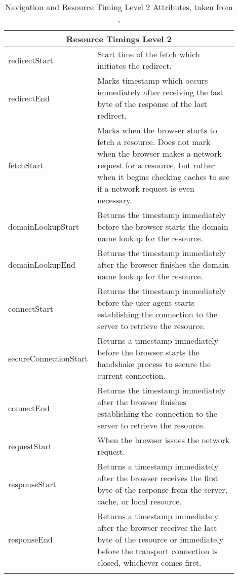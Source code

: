 \begin{center}
\begin{longtable}{ | p{0.3\linewidth} | p{0.6\linewidth} | }
	\hline
	\multicolumn{2}{|c|}{ \cellcolor{lightgrey} Resource Timings Level 2} \\
	\hline
	redirectStart & Start time of the fetch which initiates the redirect. \\
	\hline
	redirectEnd & Marks timestamp which occurs immediately after receiving the last byte of the response of the last redirect. \\
	\hline
	fetchStart & Marks when the browser starts to fetch a resource. Does not mark when the browser makes a network request for a resource, but rather when it begins checking caches to see if a network request is even necessary.  \\ %
	\hline
	domainLookupStart & Returns the timestamp immediately before the browser starts the domain name lookup for the resource. \\
	\hline
	domainLookupEnd & Returns the timestamp immediately after the browser finishes the domain name lookup for the resource. \\
	\hline
	connectStart & Returns the timestamp immediately before the user agent starts establishing the connection to the server to retrieve the resource. \\
	\hline
	secureConnectionStart & Returns a timestamp immediately before the browser starts the handshake process to secure the current connection.  \\
	\hline
	connectEnd & Returns the timestamp immediately after the browser finishes establishing the connection to the server to retrieve the resource.  \\
	\hline
	requestStart & When the browser issues the network request.  \\%
	\hline
	responseStart & Returns a timestamp immediately after the browser receives the first byte of the response from the server, cache, or local resource. \\
	\hline
	responseEnd & Returns a timestamp immediately after the browser receives the last byte of the resource or immediately before the transport connection is closed, whichever comes first. \\
	\hline
	\caption[Navigation and Resource Timing Level 2 Attributes]{Navigation and Resource Timing Level 2 Attributes, taken from \cite{2021W3CNavigationTimingLevel2}, \cite{2021W3CResourceTimingLevel2}} %
	\label{table:navigation_resource_attributes}
	\end{longtable}
\end{center}


